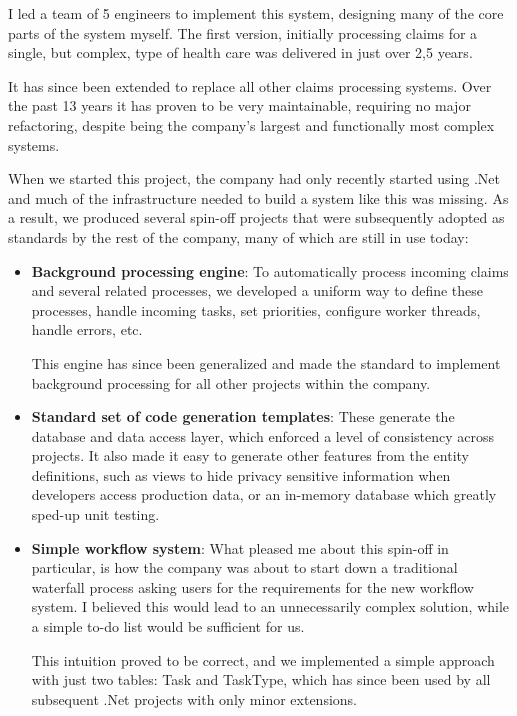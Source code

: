 \documentclass[10pt,a4paper]{../altacv}
\begin{document}
\begin{fullwidth}
		I led a team of 5 engineers to implement this system, designing many of the core parts of the system myself. The first version, initially processing claims for a single, but complex, type of health care was delivered in just over 2,5 years.
		
		\medskip\medskip
		
		It has since been extended to replace all other claims processing systems. Over the past 13 years it has proven to be very maintainable, requiring no major refactoring, despite being the company’s largest and functionally most complex systems.
		
		\medskip\medskip
		
		When we started this project, the company had only recently started using .Net and much of the infrastructure needed to build a system like this was missing. As a result, we produced several spin-off projects that were subsequently adopted as standards by the rest of the company, many of which are still in use today:
		
		\medskip\medskip
		
		\begin{itemize}
			\item\small \textbf{Background processing engine}: To automatically process incoming claims and several related processes, we developed a uniform way to define these processes, handle incoming tasks, set priorities, configure worker threads, handle errors, etc.
			
			This engine has since been generalized and made the standard to implement background processing for all other projects within the company.
			\item\small \textbf{Standard set of code generation templates}: These generate the database and data access layer, which enforced a level of consistency across projects. It also made it easy to generate other features from the entity definitions, such as views to hide privacy sensitive information when developers access production data, or an in-memory database which greatly sped-up unit testing.
			\item\small \textbf{Simple workflow system}: What pleased me about this spin-off in particular, is how the company was about to start down a traditional waterfall process asking users for the requirements for the new workflow system. I believed this would lead to an unnecessarily complex solution, while a simple to-do list would be sufficient for us.
			
			This intuition proved to be correct, and we implemented a simple approach with just two tables: Task and TaskType, which has since been used by all subsequent .Net projects with only minor extensions.
		\end{itemize}
		

\end{fullwidth}
\end{document}
